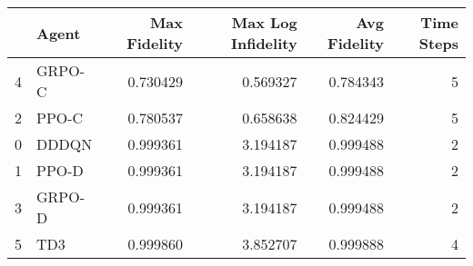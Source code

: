 \begin{tabular}{llrrrr}
\toprule
 & Agent & Max Fidelity & Max Log Infidelity & Avg Fidelity & Time Steps \\
\midrule
4 & GRPO-C & 0.730429 & 0.569327 & 0.784343 & 5 \\
2 & PPO-C & 0.780537 & 0.658638 & 0.824429 & 5 \\
0 & DDDQN & 0.999361 & 3.194187 & 0.999488 & 2 \\
1 & PPO-D & 0.999361 & 3.194187 & 0.999488 & 2 \\
3 & GRPO-D & 0.999361 & 3.194187 & 0.999488 & 2 \\
5 & TD3 & 0.999860 & 3.852707 & 0.999888 & 4 \\
\bottomrule
\end{tabular}
